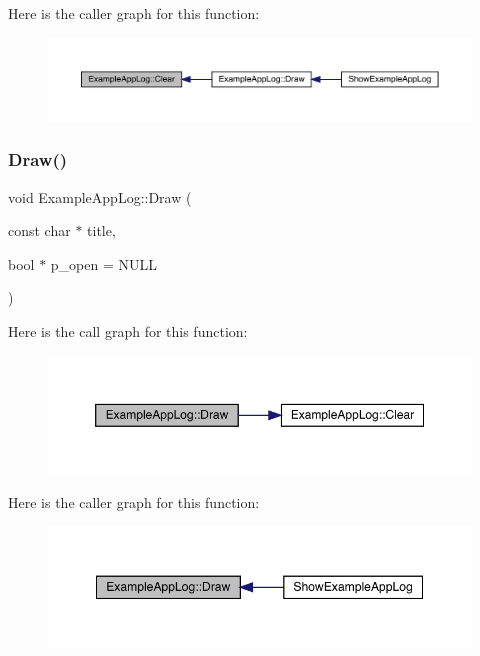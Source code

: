 Here is the caller graph for this function\+:
\nopagebreak
\begin{figure}[H]
\begin{center}
\leavevmode
\includegraphics[width=350pt]{d1/db8/struct_example_app_log_ab9c298defddbb106fdfe4ab16c5eebac_icgraph}
\end{center}
\end{figure}
\mbox{\label{struct_example_app_log_a5ad3a4bdb89171b84aeaff96948a1f77}} 
\subsubsection{\texorpdfstring{Draw()}{Draw()}}
{\footnotesize\ttfamily void Example\+App\+Log\+::\+Draw (\begin{DoxyParamCaption}\item[{const char $\ast$}]{title,  }\item[{bool $\ast$}]{p\+\_\+open = {\ttfamily NULL} }\end{DoxyParamCaption})\hspace{0.3cm}{\ttfamily [inline]}}

Here is the call graph for this function\+:
\nopagebreak
\begin{figure}[H]
\begin{center}
\leavevmode
\includegraphics[width=350pt]{d1/db8/struct_example_app_log_a5ad3a4bdb89171b84aeaff96948a1f77_cgraph}
\end{center}
\end{figure}
Here is the caller graph for this function\+:
\nopagebreak
\begin{figure}[H]
\begin{center}
\leavevmode
\includegraphics[width=349pt]{d1/db8/struct_example_app_log_a5ad3a4bdb89171b84aeaff96948a1f77_icgraph}
\end{center}
\end{figure}


